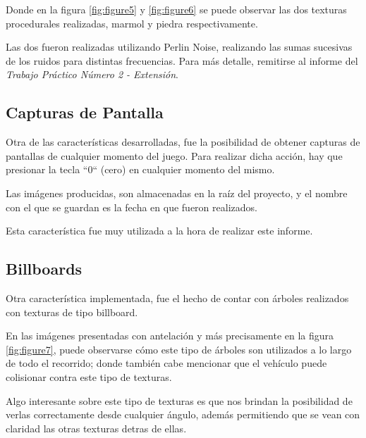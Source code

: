 \documentclass[a4paper,11pt]{article}
\begin{document}
Donde en la figura \ref{fig:figure5} y \ref{fig:figure6} se puede observar las
dos texturas procedurales realizadas, marmol y piedra respectivamente.

Las dos fueron realizadas utilizando Perlin Noise, realizando las sumas
sucesivas de los ruidos para distintas frecuencias.  Para más detalle,
remitirse al informe del \textit{Trabajo Práctico Número 2 - Extensión}.

\subsection{Capturas de Pantalla}

Otra de las características desarrolladas, fue la posibilidad de obtener
capturas de pantallas de cualquier momento del juego.  Para realizar dicha
acción, hay que presionar la tecla ``0`` (cero) en cualquier momento del
mismo.

Las imágenes producidas, son almacenadas en la raíz del proyecto, y el nombre
con el que se guardan es la fecha en que fueron realizados.

Esta característica fue muy utilizada a la hora de realizar este informe.

\subsection{Billboards}

Otra característica implementada, fue el hecho de contar con árboles realizados
con texturas de tipo billboard.

En las imágenes presentadas con antelación y más precisamente en la figura
\ref{fig:figure7}, puede observarse cómo este tipo de árboles son utilizados a
lo largo de todo el recorrido; donde también cabe mencionar que el vehículo
puede colisionar contra este tipo de texturas.

Algo interesante sobre este tipo de texturas es que nos brindan la posibilidad
de verlas correctamente desde cualquier ángulo, además permitiendo que se vean
con claridad las otras texturas detras de ellas.
\end{document}
